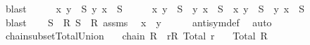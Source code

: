 \begin{isabellebody}
\ blast\isanewline
\ \ \isamarkupfalse%
\ \isamarkupfalse%
\ {\isachardoublequoteopen}{\isacharparenleft}{\kern0pt}x{\isacharcomma}{\kern0pt}\ y{\isacharparenright}{\kern0pt}\ {\isasymin}\ S{}{\isachardoublequoteclose}\ {\isachardoublequoteopen}{\isacharparenleft}{\kern0pt}y{\isacharcomma}{\kern0pt}\ x{\isacharparenright}{\kern0pt}\ {\isasymin}\ S{}{\isachardoublequoteclose}\isanewline
\ \ \isamarkupfalse%
\ \isamarkupfalse%
\ {\isachardoublequoteopen}{\isacharparenleft}{\kern0pt}{\isacharparenleft}{\kern0pt}x{\isacharcomma}{\kern0pt}\ y{\isacharparenright}{\kern0pt}\ {\isasymin}\ S{}\ {\isasymand}\ {\isacharparenleft}{\kern0pt}y{\isacharcomma}{\kern0pt}\ x{\isacharparenright}{\kern0pt}\ {\isasymin}\ S{}{\isacharparenright}{\kern0pt}\ {\isasymor}\ {\isacharparenleft}{\kern0pt}{\isacharparenleft}{\kern0pt}x{\isacharcomma}{\kern0pt}\ y{\isacharparenright}{\kern0pt}\ {\isasymin}\ S{}\ {\isasymand}\ {\isacharparenleft}{\kern0pt}y{\isacharcomma}{\kern0pt}\ x{\isacharparenright}{\kern0pt}\ {\isasymin}\ S{}{\isacharparenright}{\kern0pt}{\isachardoublequoteclose}\isanewline
\ \ \ \ \isamarkupfalse%
\ blast\isanewline
\ \ \isamarkupfalse%
\ {\isacartoucheopen}S{}\ {\isasymin}\ R{\isacartoucheclose}\ {\isacartoucheopen}S{}\ {\isasymin}\ R{\isacartoucheclose}\ assms{\isacharparenleft}{\kern0pt}{}{\isacharparenright}{\kern0pt}\ \isamarkupfalse%
\ {\isachardoublequoteopen}x\ {\isacharequal}{\kern0pt}\ y{\isachardoublequoteclose}\isanewline
\ \ \ \ \isamarkupfalse%
\ antisym{\isacharunderscore}{\kern0pt}def\ \isamarkupfalse%
\ auto\isanewline
{}\isamarkupfalse%
%
\endisatagproof
{\isafoldproof}%
%
\isadelimproof
\isanewline
%
\endisadelimproof
\isanewline
{}\isamarkupfalse%
\ chain{\isacharunderscore}{\kern0pt}subset{\isacharunderscore}{\kern0pt}Total{\isacharunderscore}{\kern0pt}Union{\isacharcolon}{\kern0pt}\isanewline
\ \ \ {\isachardoublequoteopen}chain\isactrlsub {\isasymsubseteq}\ R{\isachardoublequoteclose}\ \ {\isachardoublequoteopen}{\isasymforall}r{\isasymin}R{\isachardot}{\kern0pt}\ Total\ r{\isachardoublequoteclose}\isanewline
\ \ \ {\isachardoublequoteopen}Total\ {\isacharparenleft}{\kern0pt}{\isasymUnion}R{\isacharparenright}{\kern0pt}{\isachardoublequoteclose}\isanewline
%
\isadelimproof
%
\endisadelimproof

\end{isabellebody}
